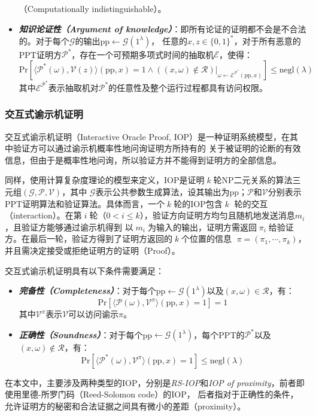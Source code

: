 \documentclass[zihao=-4]{ctexart}
\begin{document}
\begin{spacing}{1.5}
\begin{itemize}
      （Computationally indistinguishable）。
  \item \textbf{\emph{知识论证性（Argument of knowledge）}}：即所有论证的证明都不会是不合法的。对于每个$\mathcal{G}$的输出pp$\leftarrow\mathcal{G}(1^{\lambda})$，
      任意的$x,z\in\{0,1\}^*$，对于所有恶意的PPT证明方$\mathcal{P^*}$，存在一个可预期多项式时间的抽取机$\mathcal{E}$，使得：
      \[\text{Pr}[\langle \mathcal{P^*}(\omega),\mathcal{V}(z)\rangle(\text{pp},x)=1\wedge((x,\omega)\not\in\mathcal{R})|_{\omega\leftarrow\mathcal{E}^{\mathcal{P^*}}(\text{pp},x)}]\le\text{negl}(\lambda)\]
      其中$\mathcal{E}^{\mathcal{P}^*}$表示抽取机对$\mathcal{P^*}$的任意性及整个运行过程都具有访问权限。
\end{itemize}

\subsubsection{交互式谕示机证明}
交互式谕示机证明（Interactive Oracle Proof, IOP）是一种证明系统模型，在其中验证方可以通过谕示机概率性地问询证明方所持有的
关于被证明的论断的有效信息，但由于是概率性地问询，所以验证方并不能得到证明方的全部信息。\par
同样，使用计算复杂度理论的模型来定义，IOP是证明$\;k\;$轮NP二元关系的算法三元组$(\mathcal{G},\mathcal{P},\mathcal{V})$，其中
$\mathcal{G}$表示公共参数生成算法，设其输出为pp；$\mathcal{P}$和$\mathcal{V}$分别表示PPT证明算法和验证算法。具体而言，一个$\;k\;$轮的IOP包含$\;k\;$
轮的交互（interaction）。在第$\;i\;$轮（$0<i\le k$），验证方向证明方均匀且随机地发送消息$m_i$，且验证方能够通过谕示机得到
以$\;m_i\;$为输入的输出，证明方需返回$\;\pi_i\;$给验证方。在最后一轮，验证方得到了证明方返回的$\;k\;$个位置的信息
$\;\pi=(\pi_1,\cdots,\pi_k)$，并且需决定接受或拒绝证明方的证明（Proof）。\par
交互式谕示机证明具有以下条件需要满足：
\begin{itemize}
  \item \textbf{\emph{完备性（Completeness）}}：对于每个pp$\leftarrow\mathcal{G}(1^{\lambda})$以及$(x,\omega)\in\mathcal{R}$，有：
        \[\text{Pr}[\langle \mathcal{P}(\omega),\mathcal{V}^{\pi}\rangle(\text{pp},x)=1]=1\]
        其中$\mathcal{V}^{\pi}$表示$\mathcal{V}$可以访问谕示$\pi$。
  \item \textbf{\emph{正确性（Soundness）}}：对于每个pp$\leftarrow\mathcal{G}(1^{\lambda})$，每个PPT的$\mathcal{P^*}$以及$(x,\omega)\not\in\mathcal{R}$，有：
        \[\text{Pr}[\langle \mathcal{P}^*(\omega),\mathcal{V}^{\pi}\rangle(\text{pp},x)=1]\le\text{negl}(\lambda)\]
\end{itemize}\par
在本文中，主要涉及两种类型的IOP，分别是\emph{RS-IOP}和\emph{IOP of proximity}，前者即使用里德-所罗门码（Reed-Solomon code）的IOP，
后者指对于正确性的条件，允许证明方的秘密和合法证据之间具有微小的差距（proximity）。


\end{spacing}
\end{document}
